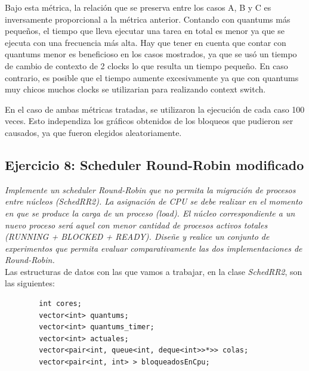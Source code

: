 \documentclass[a4paper]{article}
\begin{document}
Bajo esta m\'etrica, la relaci\'on que se preserva entre los casos A, B y C es inversamente proporcional a la m\'etrica anterior. Contando con quantums m\'as peque\~nos, el tiempo que lleva ejecutar una tarea en total es menor ya que se ejecuta con una frecuencia m\'as alta. Hay que tener en cuenta que contar con quantums menor es beneficioso en los casos mostrados, ya que se us\'o un tiempo de cambio de contexto de 2 clocks lo que resulta un tiempo peque\~no. En caso contrario, es posible que el tiempo aumente excesivamente ya que con quantums muy chicos muchos clocks se utilizarian para realizando context switch.

\bigskip
 
En el caso de ambas m\'etricas tratadas, se utilizaron la ejecuci\'on de cada caso 100 veces. Esto independiza los gr\'aficos obtenidos de los bloqueos que pudieron ser causados, ya que fueron elegidos aleatoriamente. 
 
 \newpage
 \subsection{Ejercicio 8: Scheduler Round-Robin modificado}

 
\textit{Implemente un scheduler Round-Robin que no permita la migraci\'on de procesos entre n\'ucleos (SchedRR2). La asignaci\'on de CPU se debe realizar en el momento en que se produce la carga de un proceso (load). El n\'ucleo correspondiente a un nuevo proceso ser\'a aquel con menor cantidad de procesos activos totales (RUNNING + BLOCKED + READY). Dise\~ne y realice un conjunto de experimentos que permita evaluar comparativamente las dos implementaciones de Round-Robin.}\\


Las estructuras de datos con las que vamos a trabajar, en la clase \emph{SchedRR2}, son las siguientes:


	\begin{codesnippet}
	\begin{verbatim}
		int cores;
		vector<int> quantums;
		vector<int> quantums_timer;
		vector<int> actuales;
		vector<pair<int, queue<int, deque<int>>*>> colas;
		vector<pair<int, int> > bloqueadosEnCpu;
	\end{verbatim}
	\end{codesnippet}
	
\end{document}
